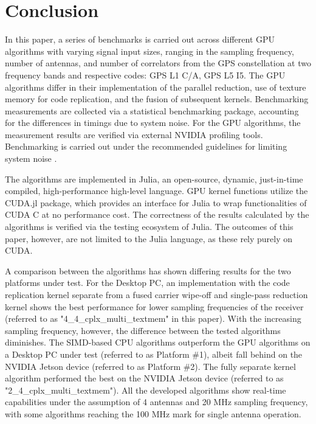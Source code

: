 \documentclass{juliacon}
\begin{document}


\section{Conclusion}\label{sec:conclusion}
In this paper, a series of benchmarks is carried out across different GPU algorithms with varying signal input sizes, ranging in the sampling frequency, number of antennas, and number of correlators from the GPS constellation at two frequency bands and respective codes: GPS L1 C/A, GPS L5 I5. The GPU algorithms differ in their implementation of the parallel reduction, use of texture memory for code replication, and the fusion of subsequent kernels. Benchmarking measurements are collected via a statistical benchmarking package, accounting for the differences in timings due to system noise. For the GPU algorithms, the measurement results are verified via external NVIDIA profiling tools. Benchmarking is carried out under the recommended guidelines for limiting system noise \cite{Fiser2019}.

The algorithms are implemented in Julia, an open-source, dynamic, just-in-time compiled, high-performance high-level language. GPU kernel functions utilize the CUDA.jl package, which provides an interface for Julia to wrap functionalities of CUDA C at no performance cost. The correctness of the results calculated by the algorithms is verified via the testing ecosystem of Julia. The outcomes of this paper, however, are not limited to the Julia language, as these rely purely on CUDA.

A comparison between the algorithms has shown differing results for the two platforms under test. For the Desktop PC, an implementation with the code replication kernel separate from a fused carrier wipe-off and single-pass reduction kernel shows the best performance for lower sampling frequencies of the receiver (referred to as "4\_4\_cplx\_multi\_textmem" in this paper). With the increasing sampling frequency, however, the difference between the tested algorithms diminishes. The SIMD-based CPU algorithms outperform the GPU algorithms on a Desktop PC under test (referred to as Platform \#1), albeit fall behind on the NVIDIA Jetson device (referred to as Platform \#2). The fully separate kernel algorithm performed the best on the NVIDIA Jetson device (referred to as "2\_4\_cplx\_multi\_textmem"). All the developed algorithms show real-time capabilities under the assumption of  4 antennas and 20 MHz sampling frequency, with some algorithms reaching the 100 MHz mark for single antenna operation.
\end{document}
